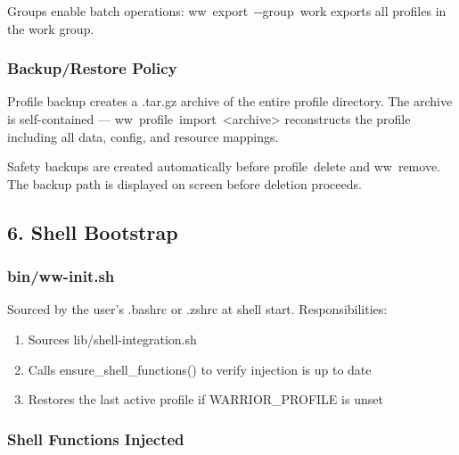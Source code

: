 \documentclass[11pt, a4paper, DIV=14]{scrartcl}
\renewcommand{\texttt}[1]{{\ttfamily\fontsize{8.5}{10.5}\selectfont\color{BabbNavy}#1}}
\let\origRule\rule
\renewcommand{\rule}[2]{\par\noindent{\color{BabbBorder}\origRule{#1}{#2}}\par}
\begin{document}
Groups enable batch operations: \texttt{ww\ export\ -\/-group\ work}
exports all profiles in the \texttt{work} group.

\subsubsection{Backup/Restore Policy}\label{backuprestore-policy}

Profile backup creates a \texttt{.tar.gz} archive of the entire profile
directory. The archive is self-contained ---
\texttt{ww\ profile\ import\ \textless{}archive\textgreater{}}
reconstructs the profile including all data, config, and resource
mappings.

Safety backups are created automatically before \texttt{profile\ delete}
and \texttt{ww\ remove}. The backup path is displayed on screen before
deletion proceeds.

\begin{center}\rule{0.5\linewidth}{0.5pt}\end{center}

\subsection{6. Shell Bootstrap}\label{shell-bootstrap}

\subsubsection{bin/ww-init.sh}\label{binww-init.sh}

Sourced by the user's \texttt{.bashrc} or \texttt{.zshrc} at shell
start. Responsibilities:

\begin{enumerate}
\def\labelenumi{\arabic{enumi}.}
\tightlist
\item
  Sources \texttt{lib/shell-integration.sh}
\item
  Calls \texttt{ensure\_shell\_functions()} to verify injection is up to
  date
\item
  Restores the last active profile if \texttt{WARRIOR\_PROFILE} is unset
\end{enumerate}

\subsubsection{Shell Functions Injected}\label{shell-functions-injected}
\end{document}
